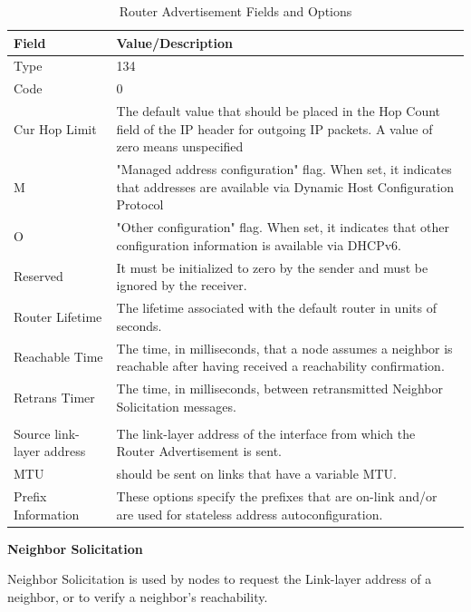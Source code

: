 \documentclass[12pt]{article}
\begin{document}
\begin{savenotes}
\begin{table}[!htpb]
\centering
\addtolength{\tabcolsep}{3pt}
\begin{tabular}{|L{3.0cm}|L{11.6cm}|}
\hline
Field&Value/Description\\
\hline
Type&134\\
\hline
Code&0\\
\hline
Cur Hop Limit&The default value that should be placed in the Hop Count field of the IP header for outgoing IP packets. A value of zero means unspecified\\
\hline
M&"Managed address configuration" flag. When set, it indicates that addresses are available via Dynamic Host Configuration Protocol\\
\hline
O&"Other configuration" flag. When set, it indicates that other configuration information is available via DHCPv6.\\
\hline
Reserved&It must be initialized to zero by the sender and must be ignored by the receiver.\\
\hline
Router Lifetime&The lifetime associated with the default router in units of seconds.\\
\hline
Reachable Time&The time, in milliseconds, that a node assumes a neighbor is reachable after having received a reachability confirmation.\\
\hline
Retrans Timer&The time, in milliseconds, between retransmitted Neighbor Solicitation messages.\\
\hline
{}
\\
\hline
Source link-layer address &The link-layer address of the interface from which the Router Advertisement is sent.\\
\hline
MTU&should be sent on links that have a variable MTU.\\
\hline
Prefix Information&These options specify the prefixes that are on-link and/or are used for stateless address autoconfiguration.\\
\hline
\end{tabular}
\caption{Router Advertisement Fields and Options}
\label{table:routerAdvfields}
\end{table}
\end{savenotes}

\textbf{Neighbor Solicitation}

Neighbor Solicitation is used by nodes to request the Link-layer address of a neighbor, or to verify a neighbor's reachability.
\end{document}
